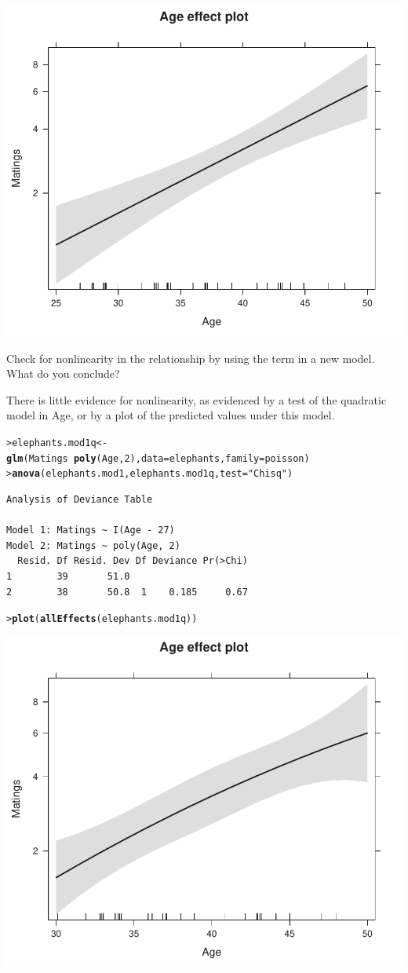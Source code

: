 \documentclass[10pt]{report}\usepackage[]{graphicx}\usepackage[]{color}
\makeatletter
\newcommand{\hlnum}[1]{\textcolor[rgb]{0.686,0.059,0.569}{#1}}%
\newcommand{\hlstr}[1]{\textcolor[rgb]{0.192,0.494,0.8}{#1}}%
\newcommand{\hlopt}[1]{\textcolor[rgb]{0,0,0}{#1}}%
\newcommand{\hlstd}[1]{\textcolor[rgb]{0.345,0.345,0.345}{#1}}%
\newcommand{\hlkwb}[1]{\textcolor[rgb]{0.69,0.353,0.396}{#1}}%
\newcommand{\hlkwc}[1]{\textcolor[rgb]{0.333,0.667,0.333}{#1}}%
\newcommand{\hlkwd}[1]{\textcolor[rgb]{0.737,0.353,0.396}{\textbf{#1}}}%
\newenvironment{kframe}{%
 \def\at@end@of@kframe{}%
 \ifinner\ifhmode%
  \def\at@end@of@kframe{\end{minipage}}%
  \begin{minipage}{\columnwidth}%
 \fi\fi%
 \def\FrameCommand##1{\hskip\@totalleftmargin \hskip-\fboxsep
 \colorbox{shadecolor}{##1}\hskip-\fboxsep
     \hskip-\linewidth \hskip-\@totalleftmargin \hskip\columnwidth}%
 \MakeFramed {\advance\hsize-\width
   \@totalleftmargin\z@ \linewidth\hsize
   \@setminipage}}%
 {\par\unskip\endMakeFramed%
 \at@end@of@kframe}
\newenvironment{knitrout}{}{} %
\renewenvironment{knitrout}{\small\renewcommand{\baselinestretch}{.85}}{} %
\makeatother
\begin{document}
\begin{Exercises}
\begin{enumerate*}
\begin{ans}
\begin{knitrout}
\centerline{\includegraphics[width=.5\textwidth]{soln/fig/ex11_1c2-1} }



\end{knitrout}
    
    \end{ans}
    
    \item Check for nonlinearity in the relationship by using the term  in a new
    model.  What do you conclude?
    \begin{ans}
    There is little evidence for nonlinearity, as evidenced by a test of the quadratic model
    in Age, or by a plot of the predicted values under this model.
\begin{knitrout}\footnotesize
{}\color{fgcolor}\begin{kframe}
\begin{alltt}
\hlstd{> }\hlstd{elephants.mod1q} \hlkwb{<-} \hlkwd{glm}\hlstd{(Matings} \hlopt{~} \hlkwd{poly}\hlstd{(Age,}\hlnum{2}\hlstd{),} \hlkwc{data}\hlstd{=elephants,} \hlkwc{family}\hlstd{=poisson)}
\hlstd{> }\hlkwd{anova}\hlstd{(elephants.mod1, elephants.mod1q,} \hlkwc{test}\hlstd{=}\hlstr{"Chisq"}\hlstd{)}
\end{alltt}
\begin{verbatim}
Analysis of Deviance Table

Model 1: Matings ~ I(Age - 27)
Model 2: Matings ~ poly(Age, 2)
  Resid. Df Resid. Dev Df Deviance Pr(>Chi)
1        39       51.0                     
2        38       50.8  1    0.185     0.67
\end{verbatim}
\begin{alltt}
\hlstd{> }\hlkwd{plot}\hlstd{(}\hlkwd{allEffects}\hlstd{(elephants.mod1q))}
\end{alltt}
\end{kframe}

\centerline{\includegraphics[width=.5\textwidth]{soln/fig/ex11_1d-1} }




\end{knitrout}
\end{ans}
\end{enumerate*}
\end{Exercises}
\end{document}
